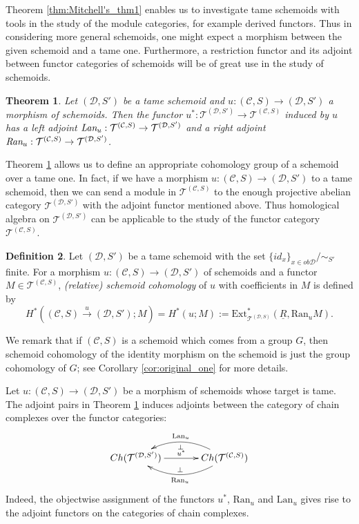 \documentclass{amsart}
\newtheorem{thm}{Theorem}[section]
\theoremstyle{definition}
\newtheorem{defn}[thm]{Definition}
\theoremstyle{remark}
\newcommand{\K}{R}%
\newcommand{\C}{{\mathcal C}}
\newcommand{\T}{{\mathcal T}}
\newcommand{\D}{\mathcal{D}}
\begin{document}
Theorem \ref{thm:Mitchell's_thm1} enables us to investigate tame schemoids with tools in the study of the module categories, for example derived functors. Thus in considering more general schemoids, one might expect a morphism between 
the given schemoid and a tame one. Furthermore, a restriction functor and its adjoint between functor categories of schemoids 
will be of great use in the study of schemoids.   

\begin{thm} \label{thm:adjoints} 
Let $(\D, S')$ be a tame schemoid and $u : (\C, S) \to (\D, S')$ a morphism of schemoids. 
Then the functor $u^* : \T^{(\D, S')} \to \T^{(\C, S)}$ induced by $u$ has a left adjoint 
$\text{\em Lan}_u : \T^{(\C, S)} \to \T^{(\D, S')}$ 
and a right adjoint $\text{\em Ran}_u : \T^{(\C, S)} \to \T^{(\D, S')}$.  
\end{thm}

Theorem \ref{thm:adjoints} allows us to define an appropriate cohomology group of a schemoid over a tame one. In fact, 
if we have a morphism $u : (\C, S) \to (\D, S')$ to a tame schemoid, then   
we can send a module in $\T^{(\C, S)}$ to the enough projective abelian category 
$\T^{(\D, S')}$ with the adjoint functor mentioned above.  Thus homological algebra on $\T^{(\D, S')}$ can be applicable to 
the study of the functor category $\T^{(\C, S)}$. 

\begin{defn} Let $(\D, S')$ be a tame schemoid with the set $\{id_x\}_{x \in ob \D}/\sim_{S'}$ finite. 
For a morphism $u : (\C, S) \to (\D, S')$ of schemoids and a functor $M \in \T^{(\C, S)}$, 
{\it (relative) schemoid cohomology} of $u$ with coefficients in $M$ is defined by 
$$
H^*( (\C, S) \stackrel{u}{\to} (\D, S') ; M) = H^*(u ; M) := 
\text{Ext}_{\T^{(\D, S)}}^*(\underline{\K}, \text{Ran}_uM). 
$$
\end{defn} 

We remark that if $(\C, S)$ is a schemoid which comes from a group $G$, then schemoid cohomology of the identity morphism on 
the schemoid is just the group cohomology of $G$; see Corollary \ref{cor:original_one} for more details.   

Let $u : (\C, S) \to (\D, S')$ be a morphism of schemoids whose target is tame.  
The adjoint pairs in Theorem \ref{thm:adjoints} induces adjoints between the category of chain complexes 
over the functor categories:
$$
\xymatrix@C35pt@R25pt{
Ch(\T^{(\D, S')}) \ar[r]^-{u^*}
& Ch(\T^{(\C, S)})   \ar@/^6mm/[l]^-{\text{Ran}_{u}}_-{\perp} 
 \ar@/_6mm/[l]_-{\text{Lan}_{u}}^-{\perp} 
}
$$
Indeed, the objectwise assignment of the functors $u^*$, $\text{Ran}_{u}$ and $\text{Lan}_{u}$ 
gives rise to the adjoint functors on the categories of chain complexes. 
\end{document}
